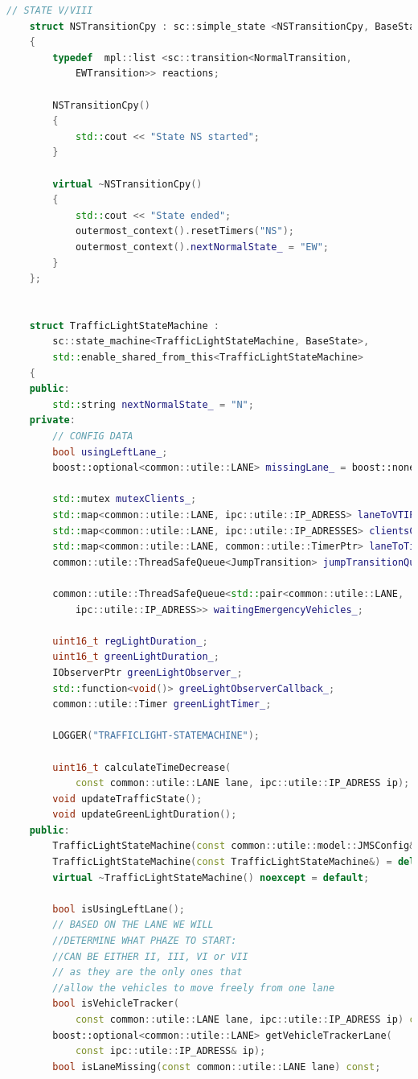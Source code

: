 \documentclass[17pt]{article}
\begin{document}
\begin{lstlisting}[language = C++]
    // STATE V/VIII
    struct NSTransitionCpy : sc::simple_state <NSTransitionCpy, BaseState>
    {
        typedef  mpl::list <sc::transition<NormalTransition,
            EWTransition>> reactions;

        NSTransitionCpy()
        {
            std::cout << "State NS started";
        }

        virtual ~NSTransitionCpy()
        {
            std::cout << "State ended";
            outermost_context().resetTimers("NS");
            outermost_context().nextNormalState_ = "EW";
        }
    };

    
    struct TrafficLightStateMachine : 
        sc::state_machine<TrafficLightStateMachine, BaseState>,
        std::enable_shared_from_this<TrafficLightStateMachine>
    {
    public:
        std::string nextNormalState_ = "N";
    private:
        // CONFIG DATA
        bool usingLeftLane_;
        boost::optional<common::utile::LANE> missingLane_ = boost::none;

        std::mutex mutexClients_;
        std::map<common::utile::LANE, ipc::utile::IP_ADRESS> laneToVTIPAdress_;
        std::map<common::utile::LANE, ipc::utile::IP_ADRESSES> clientsConnected_;
        std::map<common::utile::LANE, common::utile::TimerPtr> laneToTimerMap_;
        common::utile::ThreadSafeQueue<JumpTransition> jumpTransitionQueue_;

        common::utile::ThreadSafeQueue<std::pair<common::utile::LANE, 
            ipc::utile::IP_ADRESS>> waitingEmergencyVehicles_;
        
        uint16_t regLightDuration_;
        uint16_t greenLightDuration_;
        IObserverPtr greenLightObserver_;
        std::function<void()> greeLightObserverCallback_;
        common::utile::Timer greenLightTimer_;

        LOGGER("TRAFFICLIGHT-STATEMACHINE");

        uint16_t calculateTimeDecrease(
            const common::utile::LANE lane, ipc::utile::IP_ADRESS ip);
        void updateTrafficState();
        void updateGreenLightDuration();
    public:
        TrafficLightStateMachine(const common::utile::model::JMSConfig& config);
        TrafficLightStateMachine(const TrafficLightStateMachine&) = delete;
        virtual ~TrafficLightStateMachine() noexcept = default;

        bool isUsingLeftLane();
        // BASED ON THE LANE WE WILL 
        //DETERMINE WHAT PHAZE TO START: 
        //CAN BE EITHER II, III, VI or VII
        // as they are the only ones that 
        //allow the vehicles to move freely from one lane
        bool isVehicleTracker(
            const common::utile::LANE lane, ipc::utile::IP_ADRESS ip) const;
        boost::optional<common::utile::LANE> getVehicleTrackerLane(
            const ipc::utile::IP_ADRESS& ip);
        bool isLaneMissing(const common::utile::LANE lane) const;


\end{lstlisting}
\end{document}
